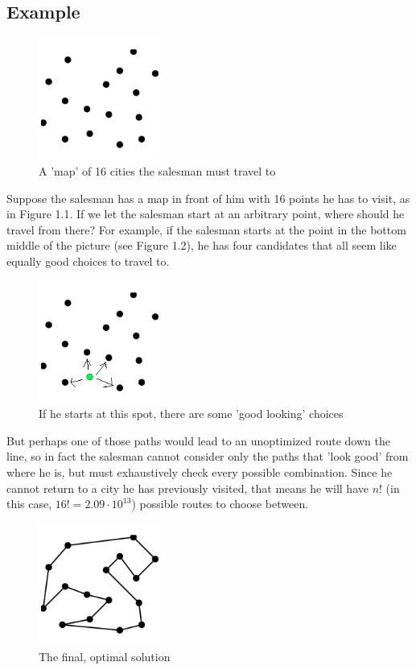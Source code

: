 \documentclass[paper=a4, fontsize=11pt]{scrartcl} %
\numberwithin{equation}{section} %
\numberwithin{figure}{section} %
\numberwithin{table}{section} %
\begin{document}
\subsection{Example}
\begin{figure}[ht!]
\centering
\includegraphics[width=40mm]{Figure_1}
\caption{A 'map' of 16 cities the salesman must travel to}
\label{overflow}
\end{figure}
Suppose the salesman has a map in front of him with 16 points he has to visit, as in Figure 1.1. If we let the salesman start at an arbitrary point, where should he travel from there? For example, if the salesman starts at the point in the bottom middle of the picture (see Figure 1.2), he has four candidates that all seem like equally good choices to travel to. 
\begin{figure}[ht!]
\centering
\includegraphics[width=40mm]{Figure_2.jpg}
\caption{If he starts at this spot, there are some 'good looking' choices}
\label{overflow}
\end{figure}
But perhaps one of those paths would lead to an unoptimized route down the line, so in fact the salesman cannot consider only the paths that 'look good' from where he is, but must exhaustively check every possible combination. Since he cannot return to a city he has previously visited, that means he will have $n!$ (in this case, $16! = 2.09 \cdot 10^{13}$) possible routes to choose between. 
\begin{figure}[ht!]
\centering
\includegraphics[width=40mm]{Figure_3}
\caption{The final, optimal solution}
\label{overflow}
\end{figure}
\end{document}
